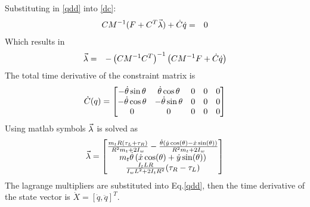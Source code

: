 \documentclass[MTRX3700report.tex]{subfiles}
\begin{document}
Substituting in \eqref{qdd} into \ref{dc}:
\begin{eqnarray}
CM^{-1}(F+C^T\vec{\lambda})+\dot{C}\dot{q} &=& 0
\end{eqnarray}
Which results in
\begin{eqnarray}
\vec{\lambda} &=&-\left( CM^{-1}C^T \right)^{-1}\left( CM^{-1}F+\dot{C}\dot{q} \right)
\end{eqnarray}
The total time derivative of the constraint matrix is
 \begin{equation}
 \dot{C}(q) = \begin{bmatrix}
 -\dot{\theta}\sin\theta & \dot{\theta}\cos\theta & 0 & 0 & 0 \\
 -\dot{\theta}\cos\theta & -\dot{\theta}\sin\theta & 0 & 0 & 0\\
 0 & 0 & 0 & 0 & 0
 \end{bmatrix}
 \end{equation}
Using matlab symbols $\vec{\lambda}$ is solved as
\begin{equation}
\vec{\lambda} = \begin{bmatrix}
\frac{m_tR(\tau_L+\tau_R)}{R^2m_t+2I_w} - \frac{\dot{\theta}\left( \dot{y}\cos(\theta)-\dot{x}\sin(\theta) \right)}{R^2m_t+2I_w} \\
m_t\dot{\theta} \left( \dot{x}\cos(\theta)+\dot{y}\sin(\theta) \right)\\
\frac{I_tLR}{I_wL^2+2I_tR^2} (\tau_R-\tau_L)
\end{bmatrix}
\end{equation}
The lagrange multipliers are substituted into Eq.\eqref{qdd}, then the time derivative of the state vector is $\dot{X}=[\dot{q},\ddot{q}]^T$.
\end{document}
